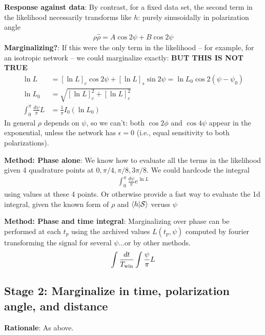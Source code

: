 \documentclass[twocolumn,prd,nofootinbib]{revtex4}
\newcommand\qmstateproduct[2]{\left\langle#1|#2\right\rangle}
\begin{document}
{\begin{shaded}
\noindent \textbf{Response against data}: By contrast, for a fixed data set, the second term in the likelihood
necessarily transforms like $h$: purely sinusoidally in polarization angle
\begin{eqnarray}
\rho \hat{\rho} = A \cos 2\psi + B \cos 2 \psi
\end{eqnarray}
\noindent \textbf{Marginalizing?}: If this were the only term in the likelihood -- for example, for an isotropic network
--  we could marginalize exactly: \textbf{BUT THIS IS NOT TRUE}
\begin{align}
\ln L  &= [\ln L]_c \cos 2\psi + [\ln L]_s \sin 2\psi = \ln L_0 \cos 2(\psi-\psi_0)  \\
\ln L_0 &= \sqrt{[\ln L]_c^2+[\ln L]_c^2} \\
\int_0^{\pi}\frac{ d\psi}{\pi} L &= \frac{1}{\pi}I_0(\ln L_0)
\end{align}
In general $\rho$ depends on $\psi$, so we can't: both $\cos 2\phi$ and $\cos 4\psi$ appear in the exponential, unless
the network has $\epsilon=0$ (i.e., equal sensitivity to both polarizations).
\end{shaded}



\noindent \textbf{Method: Phase alone}: We know how to evaluate all the terms in the likelihood given 4 quadrature
points at $0,\pi/4, \pi/8, 3\pi/8$.  We could hardcode the integral
\begin{eqnarray}
\int_0^{\pi}\frac{ d\psi}{\pi} e^{\ln L}
\end{eqnarray}
using values at these 4 points.   Or otherwise provide a fast way to evaluate the 1d integral, given the known form of
$\rho$ and $\qmstateproduct{h}{{\cal S}}$ veruss $\psi$

\noindent \textbf{Method: Phase and time integral}: Marginalizing over phase can be performed at each $t_p$ using the
archived values  $L(t_p, \psi)$ computed by fourier transforming the signal for several $\psi$...or by other methods.
\begin{eqnarray}
\int \frac{dt}{T_{\rm win}} \int \frac{\psi}{\pi}L
\end{eqnarray}




\subsection{Stage 2: Marginalize in time, polarization angle, and distance }

\noindent \textbf{Rationale}: As above.

}
\end{document}
